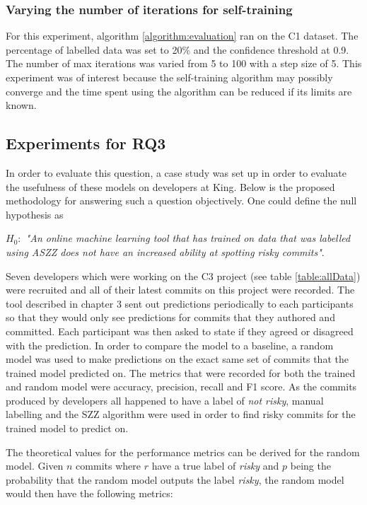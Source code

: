 \documentclass[../main.tex]{subfiles}
\begin{document}
\subsubsection{Varying the number of iterations for self-training}

For this experiment, algorithm \ref{algorithm:evaluation} ran on the C1 dataset. The percentage of labelled data was set to 20\% and the confidence threshold at 0.9. The number of max iterations was varied from 5 to 100 with a step size of 5. This experiment was of interest because the self-training algorithm may possibly converge and the time spent using the algorithm can be reduced if its limits are known. 

\subsection{Experiments for RQ3}\label{section:case_study}

In order to evaluate this question, a case study was set up in order to evaluate the usefulness of these models on developers at King. Below is the proposed methodology for answering such a question objectively. One could define the null hypothesis as
\begin{center}
    \textit{$H_0:$ "An online machine learning tool that has trained on data that was labelled using ASZZ does not have an increased ability at spotting risky commits"}.
\end{center}

Seven developers which were working on the C3 project (see table \ref{table:allData}) were recruited and all of their latest commits on this project were recorded. The tool described in chapter 3 sent out predictions periodically to each participants so that they would only see predictions for commits that they authored and committed. Each participant was then asked to state if they agreed or disagreed with the prediction. In order to compare the model to a baseline, a random model was used to make predictions on the exact same set of commits that the trained model predicted on. The metrics that were recorded for both the trained and random model were accuracy, precision, recall and F1 score. As the commits produced by developers all happened to have a label of \textit{not risky}, manual labelling and the SZZ algorithm were used in order to find risky commits for the trained model to predict on. 

The theoretical values for the performance metrics can be derived for the random model. Given $n$ commits where $r$ have a true label of \textit{risky} and $p$ being the probability that the random model outputs the label \textit{risky}, the random model would then have the following metrics:
\end{document}
